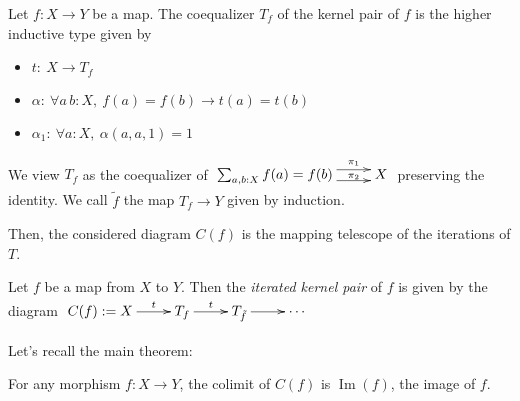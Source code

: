 \documentclass[notfinal]{jfrarticle}
\makeatletter
\def\dar[#1]#2{\ar@<-#2>[#1]\ar@<#2>[#1]} %
\DeclareMathOperator{\im}{Im}
\makeatother
\begin{document}
\begin{defi}
  Let $f:X \to Y$ be a map. The coequalizer $T_f$ of the kernel pair of $f$ is the higher inductive type given
  by
  \begin{itemize}
  \item $t:~X \to T_f$
  \item $\alpha:~\forall a\,b:X,~f(a) = f(b) \to t(a) = t(b)$
  \item $\alpha_1:~\forall a:X,~\alpha(a, a, 1) = 1$
  \end{itemize}
  We view $T_f$ as the coequalizer of
  $\xymatrix{
    \sum_{a,b:X} f(a) = f(b) \dar[r]{4pt}^-{\pi_1}_-{\pi_2} & X
  }$
  preserving the identity.
  We call $\tilde f$ the map $T_f \to Y$ given by induction.
\end{defi}

Then, the considered diagram $C(f)$  is the mapping telescope of the iterations
of $T$.
\begin{defi}
  Let $f$ be a map from $X$ to $Y$. Then the {\em iterated kernel pair} of
  $f$ 
  is given by the diagram
  $\xymatrix{
    C(f) := X \ar[r]^-t & T_f \ar[r]^-t & T_{\tilde f} \ar[r] &\cdots
  }$
\end{defi}

Let's recall the main theorem:
\begin{thm}\label{cech}
  For any morphism $f : X \to Y$, the colimit of $C(f)$ is $\im(f)$,
  the image of $f$.
\end{thm}



\end{document}
